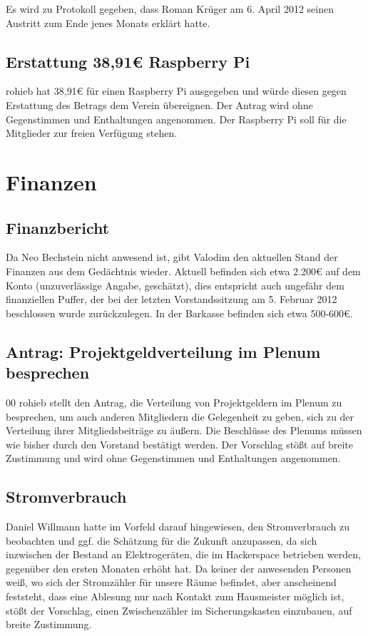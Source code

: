 \documentclass[a4paper,12pt]{scrartcl}
\begin{document}
Es wird zu Protokoll gegeben, dass Roman Krüger am 6. April 2012 seinen
Austritt zum Ende jenes Monats erklärt hatte.

\subsection{Erstattung 38{,}91€ Raspberry Pi}
rohieb hat 38{,}91€ für einen Raspberry Pi ausgegeben und würde diesen gegen
Erstattung des Betrags dem Verein übereignen. Der Antrag wird ohne Gegenstimmen
und Enthaltungen angenommen. Der Raspberry Pi soll für die Mitglieder zur
freien Verfügung stehen.

\section{Finanzen}
\subsection{Finanzbericht}
Da Neo Bechstein nicht anwesend ist, gibt Valodim den aktuellen Stand der
Finanzen aus dem Gedächtnis wieder. Aktuell befinden sich etwa 2{.}200€ auf dem
Konto (unzuverlässige Angabe, geschätzt), dies entspricht auch ungefähr dem
finanziellen Puffer, der bei der letzten Vorstandssitzung am 5. Februar 2012
beschlossen wurde zurückzulegen. In der Barkasse befinden sich etwa 500-600€.

\subsection{Antrag: Projektgeldverteilung im Plenum besprechen}
0{0}
rohieb stellt den Antrag, die Verteilung von Projektgeldern im Plenum zu
besprechen, um auch anderen Mitgliedern die Gelegenheit zu geben, sich zu der
Verteilung ihrer Mitgliedsbeiträge zu äußern. Die Beschlüsse des Plenums müssen
wie bisher durch den Vorstand bestätigt werden. Der Vorschlag stößt auf breite
Zustimmung und wird ohne Gegenstimmen und Enthaltungen angenommen.

\subsection{Stromverbrauch}
Daniel Willmann hatte im Vorfeld darauf hingewiesen, den Stromverbrauch zu
beobachten und ggf. die Schätzung für die Zukunft anzupassen, da sich inzwischen
der Bestand an Elektrogeräten, die im Hackerspace betrieben werden, gegenüber
den ersten Monaten erhöht hat. Da keiner der anwesenden Personen weiß, wo sich
der Stromzähler für unsere Räume befindet, aber anscheinend feststeht, dass eine
Ablesung nur nach Kontakt zum Hausmeister möglich ist, stößt der Vorschlag,
einen Zwischenzähler im Sicherungskasten einzubauen, auf breite Zustimmung.
\end{document}

